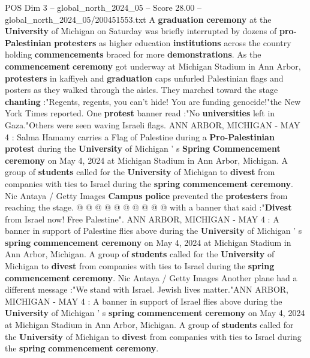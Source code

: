 \begin{textsample}{POS Dim 3 – global\_north\_2024\_05 – Score 28.00 – global\_north\_2024\_05/200451553.txt}  \label{ex:f3_pos_003}
A \textbf{graduation} \textbf{ceremony} at the \textbf{University} of Michigan on Saturday was briefly interrupted by dozens of \textbf{pro-Palestinian} \textbf{protesters} as higher education \textbf{institutions} across the country holding \textbf{commencements} braced for more \textbf{demonstrations}.
As the \textbf{commencement} \textbf{ceremony} got underway at Michigan Stadium in Ann Arbor, \textbf{protesters} in kaffiyeh and \textbf{graduation} caps unfurled Palestinian flags and posters as they walked through the aisles.
They marched toward the stage \textbf{chanting} :"Regents, regents, you can't hide!
You are funding genocide!"the New York Times reported.
One \textbf{protest} banner read :"No \textbf{universities} left in Gaza."Others were seen waving Israeli flags.
ANN ARBOR, MICHIGAN - MAY 4 : Salma Hamamy carries a Flag of Palestine during a \textbf{Pro-Palestinian} \textbf{protest} during the \textbf{University} of Michigan ' s \textbf{Spring} \textbf{Commencement} \textbf{ceremony} on May 4, 2024 at Michigan Stadium in Ann Arbor, Michigan.
A group of \textbf{students} called for the \textbf{University} of Michigan to \textbf{divest} from companies with ties to Israel during the \textbf{spring} \textbf{commencement} \textbf{ceremony}.
Nic Antaya / Getty Images \textbf{Campus} \textbf{police} prevented the \textbf{protesters} from reaching the stage. @ @ @ @ @ @ @ @ @ @ with a banner that said :"\textbf{Divest} from Israel now!
Free Palestine".
ANN ARBOR, MICHIGAN - MAY 4 : A banner in support of Palestine flies above during the \textbf{University} of Michigan ' s \textbf{spring} \textbf{commencement} \textbf{ceremony} on May 4, 2024 at Michigan Stadium in Ann Arbor, Michigan.
A group of \textbf{students} called for the \textbf{University} of Michigan to \textbf{divest} from companies with ties to Israel during the \textbf{spring} \textbf{commencement} \textbf{ceremony}.
Nic Antaya / Getty Images Another plane had a different message :"We stand with Israel.
Jewish lives matter."ANN ARBOR, MICHIGAN - MAY 4 : A banner in support of Israel flies above during the \textbf{University} of Michigan ' s \textbf{spring} \textbf{commencement} \textbf{ceremony} on May 4, 2024 at Michigan Stadium in Ann Arbor, Michigan.
A group of \textbf{students} called for the \textbf{University} of Michigan to \textbf{divest} from companies with ties to Israel during the \textbf{spring} \textbf{commencement} \textbf{ceremony}.

\end{textsample}
